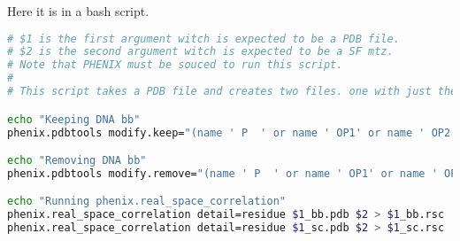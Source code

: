 \documentclass[12pt]{article}
\begin{document}
\vspace{6mm}
\noindent
Here it is in a bash script.
\begin{lstlisting}[language=bash]
# $1 is the first argument witch is expected to be a PDB file.
# $2 is the second argument witch is expected to be a SF mtz.
# Note that PHENIX must be souced to run this script.
#
# This script takes a PDB file and creates two files. one with just the DNA BB ("xxxxx_bb.pdb") and the other with the DNA BB removed ("xxxxx_sc.pdb"). Then phenix.real_space_correlation is ran on each file creating xxxxx_bb.rsc and xxxxx_sc.rsc.

echo "Keeping DNA bb"
phenix.pdbtools modify.keep="(name ' P  ' or name ' OP1' or name ' OP2' or name ' O5\'' or name ' C5\'' or name ' C4\'' or name ' O4\'' or name ' C3\'' or name ' O3\'' or name ' C2\'' or name ' C1\'')" output.file_name="$1_bb.pdb" $1

echo "Removing DNA bb"
phenix.pdbtools modify.remove="(name ' P  ' or name ' OP1' or name ' OP2' or name ' O5\'' or name ' C5\'' or name ' C4\'' or name ' O4\'' or name ' C3\'' or name ' O3\'' or name ' C2\'' or name ' C1\'')" output.file_name="$1_sc.pdb" $1

echo "Running phenix.real_space_correlation"
phenix.real_space_correlation detail=residue $1_bb.pdb $2 > $1_bb.rsc
phenix.real_space_correlation detail=residue $1_sc.pdb $2 > $1_sc.rsc
\end{lstlisting}
\end{document}
